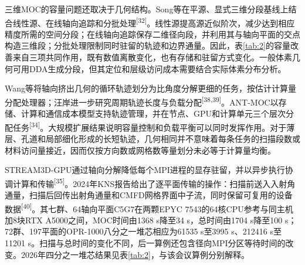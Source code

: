 \documentclass[UTF8, zihao=-4, fontset=none, a4paper]{ctexart}
\newcommand{\upcite}[1]{\textsuperscript{[#1]}}
\begin{document}
三维MOC的容量问题还取决于几何结构。Song等在平源、显式三维分段基线上结合线性源、在线轴向追踪和分批处理\upcite{32}。线性源提高源近似阶次，减少达到相应精度所需的空间分段；在线轴向追踪保存二维径向段，并利用其与轴向平面的交点构造三维段；分批处理限制同时驻留的轨迹和边界通量。因此，表\ref{tab:2}的容量改善来自三项共同作用，既有数值离散变化，也有存储和驻留方式变化。一般体素几何可用DDA生成分段，但其定位和层级访问成本需要结合实际体素分布分析。

Wang等将轴向挤出几何的循环轨迹划分为比角度分解更细的任务，按估计计算量分配处理器；汪岸进一步研究周期轨迹长度与负载分配\upcite{38,39}。ANT-MOC以存储、计算和通信成本模型支持轨迹管理，并在节点、GPU和计算单元三个层次分配任务\upcite{34}。大规模扩展结果说明容量控制和负载平衡可以同时发挥作用。对于薄层、孔道和局部细化形成的长短轨迹，几何相同并不意味着每条任务的扫描段数或材料访问量接近，因而仅按方向数或网格数等量划分未必等于计算量均衡。

STREAM3D-GPU通过轴向分解降低每个MPI进程的显存驻留，并以异步执行协调计算和传输\upcite{35}。2024年KNS报告给出了逐平面传输的操作：扫描前送入入射角通量，扫描后回传出射角通量和CMFD网格界面中子流，同时保留可复用的设备数据\upcite{40}。其七群、64轴向平面C5G7在两颗EPYC 7543的64核CPU参考与同主机加8块RTX A5000之间，MOC时间由1368 s降至34 s，总时间由1704 s降至100 s；72群、197平面的OPR-1000八分之一堆芯相应为61535 s至3995 s、212416 s至11201 s。扫描与总时间的变化不同，后一算例还包含径向MPI分区等待时间的改变。2026年四分之一堆芯结果见表\ref{tab:2}，与该会议算例分别解释。
\end{document}

